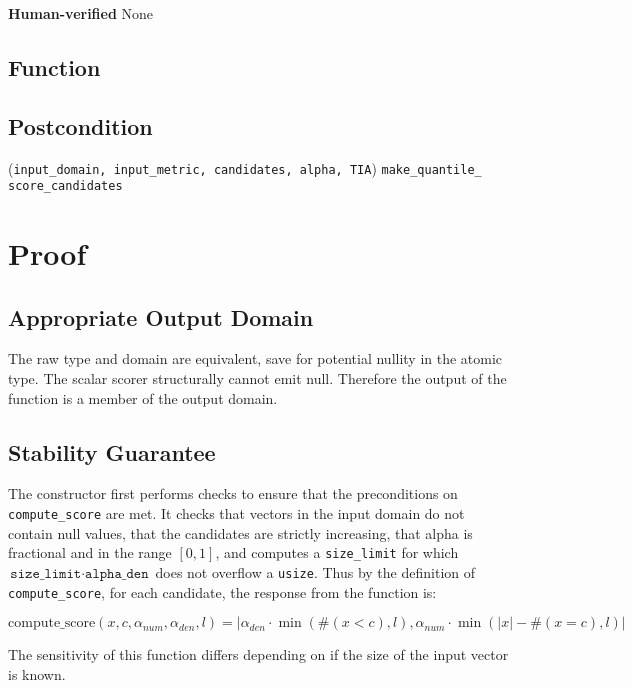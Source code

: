 \documentclass{article}
\begin{document}
\textbf{Human-verified}
None

\subsection*{Function} 
\label{sec:python-pseudocode} 
 
 
 
\subsection*{Postcondition} 
\validTransformation 
    {(\texttt{input\_domain, input\_metric, candidates, alpha, TIA})} 
    {\texttt{make\_quantile\_ score\_candidates}} 
 
\section{Proof} 
\subsection{Appropriate Output Domain} 
\label{sec:approp-output-domain} 
The raw type and domain are equivalent, save for potential nullity in the atomic type.  
The scalar scorer structurally cannot emit null. 
Therefore the output of the function is a member of the output domain. 
 
\subsection{Stability Guarantee} 
 
The constructor first performs checks to ensure that the preconditions on \texttt{compute\_score} are met. 
It checks that vectors in the input domain do not contain null values, 
that the candidates are strictly increasing, 
that alpha is fractional and in the range $[0, 1]$, 
and computes a \texttt{size\_limit} for which $\texttt{size\_limit} \cdot \texttt{alpha\_den}$ does not overflow a \texttt{usize}. 
Thus by the definition of \texttt{compute\_score}, for each candidate, the response from the function is: 
 
\begin{equation} 
    \textrm{compute\_score}(x, c, \alpha_{num}, \alpha_{den}, l) = |\alpha_{den} \cdot \min(\#(x < c), l), \alpha_{num} \cdot \min(|x| - \#(x = c), l)| 
\end{equation} 
 
The sensitivity of this function differs depending on if the size of the input vector is known. 
 
\end{document}
